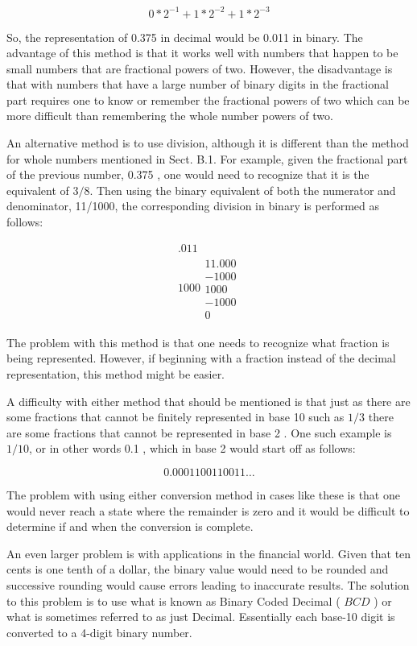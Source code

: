 \documentclass[10pt]{book}
\begin{document}
$$
0 * 2^{-1}+1 * 2^{-2}+1 * 2^{-3}
$$

So, the representation of 0.375 in decimal would be 0.011 in binary. The advantage of this method is that it works well with numbers that happen to be small numbers that are fractional powers of two. However, the disadvantage is that with numbers that have a large number of binary digits in the fractional part requires one to know or remember the fractional powers of two which can be more difficult than remembering the whole number powers of two.

An alternative method is to use division, although it is different than the method for whole numbers mentioned in Sect. B.1. For example, given the fractional part of the previous number, 0.375 , one would need to recognize that it is the equivalent of $3 / 8$. Then using the binary equivalent of both the numerator and denominator, 11/1000, the corresponding division in binary is performed as follows:

$$
\begin{array}{r}
.011 \\
1000 \begin{array}{r}
11.000 \\
-1000 \\
\hline 1000 \\
-1000 \\
\hline 0
\end{array}
\end{array}
$$

The problem with this method is that one needs to recognize what fraction is being represented. However, if beginning with a fraction instead of the decimal representation, this method might be easier.

A difficulty with either method that should be mentioned is that just as there are some fractions that cannot be finitely represented in base 10 such as $1 / 3$ there are some fractions that cannot be represented in base 2 . One such example is $1 / 10$, or in other words 0.1 , which in base 2 would start off as follows:

$$
0.0001100110011 \ldots
$$

The problem with using either conversion method in cases like these is that one would never reach a state where the remainder is zero and it would be difficult to determine if and when the conversion is complete.

An even larger problem is with applications in the financial world. Given that ten cents is one tenth of a dollar, the binary value would need to be rounded and successive rounding would cause errors leading to inaccurate results. The solution to this problem is to use what is known as Binary Coded Decimal ( $B C D$ ) or what is sometimes referred to as just Decimal. Essentially each base-10 digit is converted to a 4-digit binary number.
\end{document}
